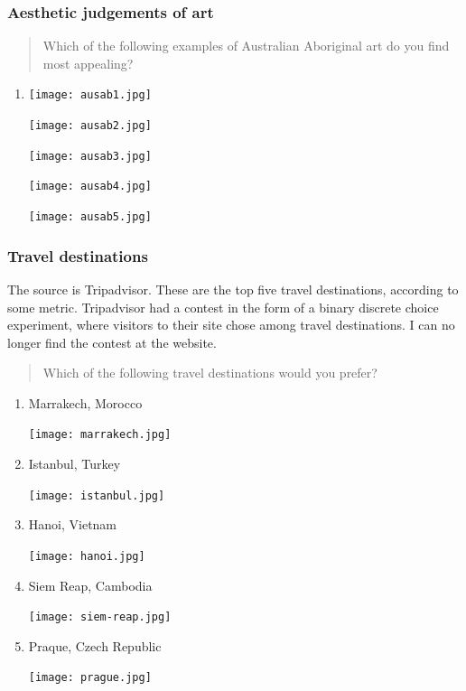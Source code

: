 \documentclass[11pt,letter]{amsart}
\begin{document}
\subsubsection{Aesthetic judgements of art}

\begin{quotation}
Which of the following examples of Australian Aboriginal art do you find
most appealing?
\end{quotation}

\begin{enumerate}
\item  \texttt{[image: ausab1.jpg]}

\texttt{[image: ausab2.jpg]}

\texttt{[image: ausab3.jpg]}

\texttt{[image: ausab4.jpg]}

\texttt{[image: ausab5.jpg]}
\end{enumerate}

\subsubsection{Travel destinations}

The source is Tripadvisor. These are the top five travel destinations,
according to some metric. Tripadvisor had a contest in the form of a binary
discrete choice experiment, where visitors to their site chose among travel
destinations. I can no longer find the contest at the website.

\begin{quotation}
Which of the following travel destinations would you prefer?
\end{quotation}

\begin{enumerate}
\item Marrakech, Morocco

\texttt{[image: marrakech.jpg]}

\item Istanbul, Turkey

\texttt{[image: istanbul.jpg]}

\item Hanoi, Vietnam

\texttt{[image: hanoi.jpg]}

\item Siem Reap, Cambodia

\texttt{[image: siem-reap.jpg]}

\item Praque, Czech Republic

\texttt{[image: prague.jpg]}
\end{enumerate}
\end{document}
